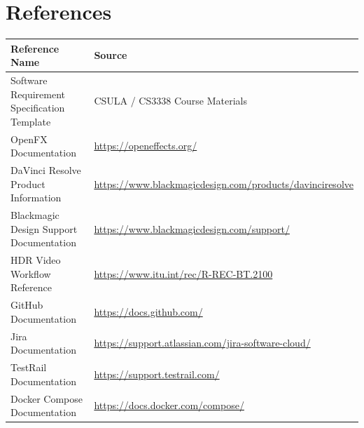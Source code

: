 \documentclass[12pt]{article}
\begin{document}
\section*{References}
\begin{table}[H]
\centering
\renewcommand{\arraystretch}{1.6}
\begin{tabular}{|p{6.2cm}|p{8.0cm}|}
\hline
\textbf{Reference Name} & \textbf{Source} \\
\hline
Software Requirement Specification Template & CSULA / CS3338 Course Materials \\
\hline
OpenFX Documentation & \url{https://openeffects.org/} \\
\hline
DaVinci Resolve Product Information & \url{https://www.blackmagicdesign.com/products/davinciresolve} \\
\hline
Blackmagic Design Support Documentation & \url{https://www.blackmagicdesign.com/support/} \\
\hline
HDR Video Workflow Reference & \url{https://www.itu.int/rec/R-REC-BT.2100} \\
\hline
GitHub Documentation & \url{https://docs.github.com/} \\
\hline
Jira Documentation & \url{https://support.atlassian.com/jira-software-cloud/} \\
\hline
TestRail Documentation & \url{https://support.testrail.com/} \\
\hline
Docker Compose Documentation & \url{https://docs.docker.com/compose/} \\
\hline
\end{tabular}
\end{table}

\end{document}
